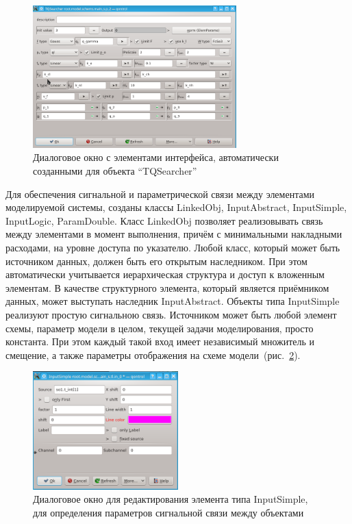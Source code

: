 \begin{figure}[htb!]
  \begin{center}
    \includegraphics[width=0.7\textwidth]{p/qontrol_tqsearch.png}
  \end{center}
  \caption{Диалоговое окно с элементами интерфейса, автоматически созданными для объекта ``TQSearcher''}
  \label{atu:f:qontrol_qsearch}
\end{figure}

Для обеспечения сигнальной и параметрической связи между элементами
моделируемой системы, созданы классы LinkedObj, InputAbstract,
InputSimple, InputLogic, ParamDouble.
Класс LinkedObj позволяет реализовывать связь между элементами в момент выполнения,
причём с минимальными накладными расходами, на уровне доступа по указателю.
Любой класс, который может быть источником данных, должен быть его открытым наследником.
При этом автоматически учитывается иерархическая структура
и доступ к вложенным элементам.
В качестве структурного элемента, который является приёмником
данных, может выступать наследник InputAbstract.
Объекты типа InputSimple реализуют простую сигнальною связь.
Источником может быть любой элемент схемы, параметр
модели в целом, текущей задачи моделирования, просто константа.
При этом каждый такой вход имеет независимый множитель и смещение,
а также параметры отображения на схеме модели~(рис.~\ref{atu:f:qontrol_link}).


\begin{figure}[htb!]
  \begin{center}
    \includegraphics[width=0.5\textwidth]{p/qontrol_link.png}
  \end{center}
  \caption{Диалоговое окно для редактирования элемента типа InputSimple, для определения параметров сигнальной связи между объектами}
  \label{atu:f:qontrol_link}
\end{figure}

